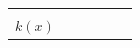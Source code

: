 {\begin{tabular}[t]{|l|l|l|l|l|l|}
         &
         &
         &
     \tabularnewline\cline{1-1}\cline{2-2}\cline{3-3}\cline{4-4}\cline{5-5}\cline{6-6}
                  $k\left(x\right)$
                 &
         &
         &
         &
         &
     \tabularnewline\cline{1-1}\cline{2-2}\cline{3-3}\cline{4-4}\cline{5-5}\cline{6-6}
    \end{tabular}} %
        \addtolength{\mytableboxheight}{\mytableboxdepth}
